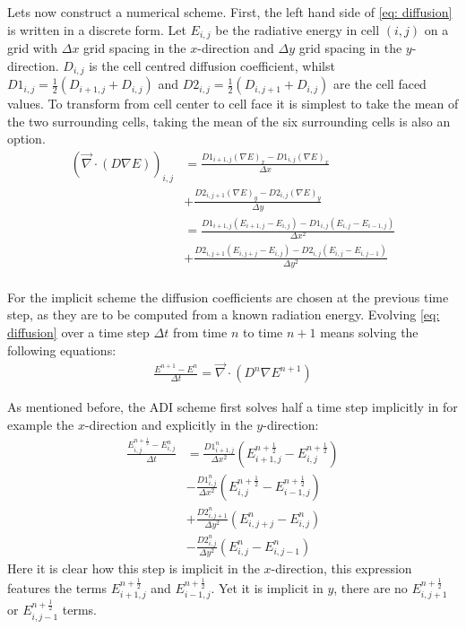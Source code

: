 Lets now construct a numerical scheme. First, the left hand side of \eqref{eq: diffusion} is written in a discrete form. Let $E_{i,j}$ be the radiative energy in cell $(i,j)$ on a grid with $\Delta x$ grid spacing in the $x$-direction and $\Delta y$ grid spacing in the $y$-direction. $D_{i,j}$ is the cell centred diffusion coefficient, whilst $D1_{i,j} = \frac{1}{2} (D_{i+1,j} + D_{i,j})$ and $D2_{i,j} = \frac{1}{2} (D_{i,j+1} + D_{i,j})$ are the cell faced values. To transform from cell center to cell face it is simplest to take the mean of the two surrounding cells, taking the mean of the six surrounding cells is also an option. 
\begin{align}
\left( \vec{\nabla} \cdot \left(D \nabla E\right) \right)_{i,j} 
 &= \frac{D1_{i+1,j} (\nabla E)_{x} - D1_{i,j} (\nabla E)_{x}}{\Delta x} \\
 &+ \frac{D2_{i,j+1} (\nabla E)_{y} - D2_{i,j} (\nabla E)_{y}}{\Delta y} \\ 
 &= \frac{D1_{i+1,j} (E_{i+1,j} - E_{i,j}) - D1_{i,j} (E_{i,j} - E_{i-1,j})}{\Delta x^2} \\
 &+ \frac{D2_{i,j+1} (E_{i,j+j} - E_{i,j}) - D2_{i,j} (E_{i,j} - E_{i,j-1})}{\Delta y^2} \\ 
\end{align}

For the implicit scheme the diffusion coefficients are chosen at the previous time step, as they are to be computed from a known radiation energy. Evolving \eqref{eq: diffusion} over a time step $\Delta t$ from time $n$ to time $n+1$ means solving the following equations:
\begin{align}
\frac{E^{n+1} - E^{n}}{\Delta t} = \vec{\nabla} \cdot \left(D^n \nabla E^{n+1}\right) \label{eq: Error_control}
\end{align}

As mentioned before, the ADI scheme first solves half a time step implicitly in for example the $x$-direction and explicitly in the $y$-direction:
\begin{align}
\frac{E_{i,j}^{n+\frac{1}{2}} - E_{i,j}^{n}}{\Delta t}
 &= \frac{D1_{i+1,j}^{n}}{\Delta x^2} (E_{i+1,j}^{n+\frac{1}{2}} - E_{i,j}^{n+\frac{1}{2}}) \\
 &- \frac{D1_{i,j}^{n}}{\Delta x^2} (E_{i,j}^{n+\frac{1}{2}} - E_{i-1,j}^{n+\frac{1}{2}}) \\
 &+ \frac{D2_{i,j+1}^{n}}{\Delta y^2} (E_{i,j+j}^{n} - E_{i,j}^{n}) \\
 &- \frac{D2_{i,j}^{n}}{\Delta y^2} (E_{i,j}^{n} - E_{i,j-1}^{n})
\end{align}
Here it is clear how this step is implicit in the $x$-direction, this expression features the terms $E_{i+1,j}^{n+\frac{1}{2}}$ and $E_{i-1,j}^{n+\frac{1}{2}}$. Yet it is implicit in $y$, there are no $E_{i,j+1}^{n+\frac{1}{2}}$ or $E_{i,j-1}^{n+\frac{1}{2}}$ terms.\\

